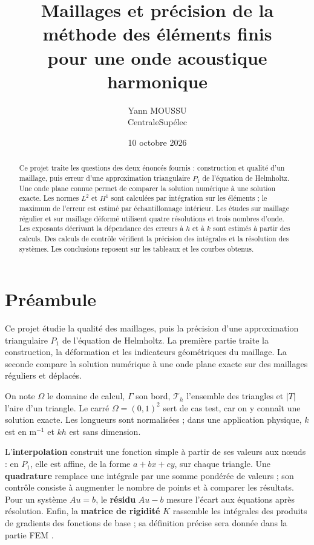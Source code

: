 \documentclass[12pt,a4paper]{article}
\title{Maillages et précision de la méthode des éléments finis\\pour une onde acoustique harmonique}
\author{Yann MOUSSU\\CentraleSupélec}
\date{10 octobre 2026}
\begin{document}
\maketitle
\begin{abstract}
Ce projet traite les questions des deux énoncés fournis : construction et qualité d'un maillage, puis erreur d'une approximation triangulaire $P_1$ de l'équation de Helmholtz. Une onde plane connue permet de comparer la solution numérique à une solution exacte. Les normes $L^2$ et $H^1$ sont calculées par intégration sur les éléments ; le maximum de l'erreur est estimé par échantillonnage intérieur. Les études sur maillage régulier et sur maillage déformé utilisent quatre résolutions et trois nombres d'onde. Les exposants décrivant la dépendance des erreurs à $h$ et à $k$ sont estimés à partir des calculs. Des calculs de contrôle vérifient la précision des intégrales et la résolution des systèmes. Les conclusions reposent sur les tableaux et les courbes obtenus.
\end{abstract}
\newpage
\setcounter{tocdepth}{2}
\tableofcontents
\newpage

\section*{Préambule}
Ce projet étudie la qualité des maillages, puis la précision d’une approximation triangulaire $P_1$ de l’équation de Helmholtz. La première partie traite la construction, la déformation et les indicateurs géométriques du maillage. La seconde compare la solution numérique à une onde plane exacte sur des maillages réguliers et déplacés.

On note $\Omega$ le domaine de calcul, $\Gamma$ son bord, $\mathcal T_h$ l'ensemble des triangles et $|T|$ l'aire d'un triangle. Le carré $\Omega=(0,1)^2$ sert de cas test, car on y connaît une solution exacte. Les longueurs sont normalisées ; dans une application physique, $k$ est en $\mathrm{m}^{-1}$ et $kh$ est sans dimension.

L'\textbf{interpolation} construit une fonction simple à partir de ses valeurs aux nœuds : en $P_1$, elle est affine, de la forme $a+bx+cy$, sur chaque triangle. Une \textbf{quadrature} remplace une intégrale par une somme pondérée de valeurs ; son contrôle consiste à augmenter le nombre de points et à comparer les résultats. Pour un système $Au=b$, le \textbf{résidu} $Au-b$ mesure l'écart aux équations après résolution. Enfin, la \textbf{matrice de rigidité} $K$ rassemble les intégrales des produits de gradients des fonctions de base ; sa définition précise sera donnée dans la partie FEM \cite{fem,linear}.
\end{document}
